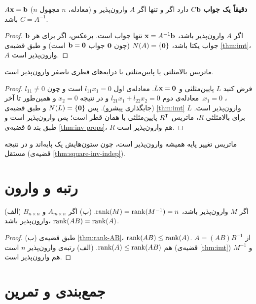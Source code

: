 \begin{theorem}
$A\mathbf{x}=\mathbf{b}$ ($n$ معادله، $n$ مجهول) \textbf{دقیقاً یک جواب} $C\mathbf{b}$ دارد اگر و تنها اگر $A$ وارون‌پذیر و $C=A^{-1}$ باشد.
\end{theorem}
\begin{proof}
اگر $A$ وارون‌پذیر باشد، $\mathbf{x}=A^{-1}\mathbf{b}$ تنها جواب است. برعکس، اگر برای هر $\mathbf{b}$ جواب یکتا باشد، $N(A)=\{\mathbf{0}\}$ (چون $\mathbf{0}$ جواب $\mathbf{b}=\mathbf{0}$ است) و طبق قضیه‌ی \ref{thm:imt}، $A$ وارون‌پذیر است.
\end{proof}

\begin{theorem}\label{thm:triangular-inv}
ماتریس بالامثلثی یا پایین‌مثلثی با درایه‌های قطری ناصفر وارون‌پذیر است.
\end{theorem}
\begin{proof}
فرض کنید $L$ پایین‌مثلثی و $L\mathbf{x}=\mathbf{0}$. معادله‌ی اول $l_{11}x_1=0$ است و چون $l_{11}\neq0$، $x_1=0$. معادله‌ی دوم $l_{21}x_1+l_{22}x_2=0$ و در نتیجه $x_2=0$ و همین‌طور تا آخر (جایگذاری پیشرو). پس $N(L)=\{\mathbf{0}\}$ و طبق قضیه‌ی \ref{thm:imt} $L$ وارون‌پذیر است. برای بالامثلثی $R$، ماتریس $R^{\mathsf{T}}$ پایین‌مثلثی با همان قطر است؛ پس وارون‌پذیر است و طبق بند ۵ قضیه‌ی \ref{thm:inv-props}، $R$ هم وارون‌پذیر است.
\end{proof}

\begin{note}
ماتریس تغییر پایه  همیشه وارون‌پذیر است، چون ستون‌هایش یک پایه‌اند و در نتیجه مستقل (قضیه‌ی \ref{thm:square-inv-indep}).
\end{note}

\section{رتبه و وارون}

\begin{theorem}\label{thm:rank-inverse}
(الف) اگر $M$ وارون‌پذیر باشد، $\operatorname{rank}(M)=\operatorname{rank}(M^{-1})=n$. (ب) اگر $A_{m\times n}$ و $B_{n\times n}$ وارون‌پذیر باشد، $\operatorname{rank}(AB)=\operatorname{rank}(A)$.
\end{theorem}
\begin{proof}
(ب) طبق قضیه‌ی \ref{thm:rank-AB}، $\operatorname{rank}(AB)\le\operatorname{rank}(A)$. از $A=(AB)B^{-1}$ هم $\operatorname{rank}(A)\le\operatorname{rank}(AB)$. (الف) رتبه‌ی  وارون‌پذیر $n$ است (قضیه‌ی \ref{thm:imt}) و $M^{-1}$ هم وارون‌پذیر است.
\end{proof}

\section{جمع‌بندی و تمرین}

